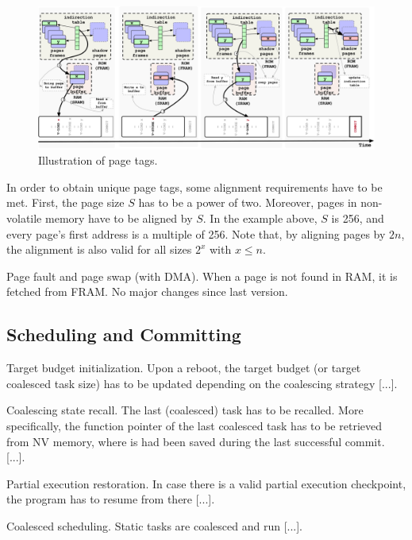 \begin{figure}
	\centering
	\includegraphics[width=\textwidth]{figures/graffle/paging.pdf}
	\caption{Illustration of \sys page tags.}
\end{figure}

In order to obtain unique page tags, some alignment requirements have to be met. First, the page size $S$ has to be a power of two. Moreover, pages in non-volatile memory have to be aligned by $S$. In the example above, $S$ is 256, and every page’s first address is a multiple of 256. Note that, by aligning pages by $2n$, the alignment is also valid for all sizes $2^x$ with $x \leq n$.

Page fault and page swap (with DMA). When a page is not found in RAM, it is fetched from FRAM. No major changes since last version.

\subsection{\sys Scheduling and Committing}

Target budget initialization. Upon a reboot, the target budget (or target coalesced task size) has to be updated depending on the coalescing strategy [...].

Coalescing state recall. The last (coalesced) task has to be recalled. More specifically, the function pointer of the last coalesced task has to be retrieved from NV memory, where is had been saved during the last successful commit. [...].

Partial execution restoration. In case there is a valid partial execution checkpoint, the program has to resume from there [...].

Coalesced scheduling. Static tasks are coalesced and run [...].

